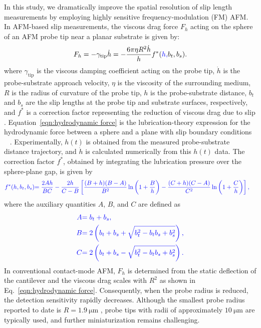 \documentclass[journal=jacsat,manuscript=article]{achemso}
\providecommand{\DIFadd}[1]{{\protect\color{blue}#1}} %
\providecommand{\DIFaddbegin}{} %
\providecommand{\DIFaddend}{} %
\newcommand{\DIFaddincludegraphics}[2][]{{\color{blue}\DIFOincludegraphics[#1]{#2}}} %
\DeclareRobustCommand{\DIFaddbegin}{\DIFOaddbegin \let\includegraphics\DIFaddincludegraphics} %
\DeclareRobustCommand{\DIFaddend}{\DIFOaddend \let\includegraphics\DIFOincludegraphics} %
\begin{document}
In this study, we dramatically improve the spatial resolution of slip length measurements by employing highly sensitive frequency-modulation (FM) AFM. In AFM-based slip measurements, the viscous drag force \(F_h\) acting on the sphere of an AFM probe tip near a planar substrate is given by:
\begin{equation}
F_h=-\gamma_{\text{tip}} \dot{h}=-\frac{6\pi\eta R^2 \dot{h}}{h} f^* (\DIFaddbegin \DIFadd{h,}\DIFaddend b_t,b_s). \label{eqn:hydrodynamic force}
\end{equation}
where \(\gamma_{\text{tip}}\) is the viscous damping coefficient acting on the probe tip, \DIFaddbegin \DIFadd{\(\dot{h}\) is the probe-substrate approach velocity, }\DIFaddend \(\eta\) is the viscosity of the surrounding medium, \(R\) is the radius of curvature of the probe tip, \(h\) is the probe-substrate distance, \(b_t\) and \(b_s\) are the slip lengths at the probe tip and substrate surfaces, respectively, and \(f^*\) is a correction factor representing the reduction of viscous drag due to slip \cite{Vinogradova1995-ct}. \DIFaddbegin \DIFadd{Equation~\ref{eqn:hydrodynamic force} is the lubrication-theory expression for the hydrodynamic force between a sphere and a plane with slip boundary conditions \mbox{%
\cite{Vinogradova1995-ct}}\hskip0pt%
. Experimentally, \(h(t)\) is obtained from the measured probe-substrate distance trajectory, and \(\dot{h}\) is calculated numerically from this \(h(t)\) data.
The correction factor \(f^*\), obtained by integrating the lubrication pressure over the sphere-plane gap, is given by
}\begin{align}
\DIFadd{f^* (h,b_t,b_s)
}&\DIFadd{= \frac{2Ah}{BC}
- \frac{2h}{C-B}
\left[
\frac{(B+h)(B-A)}{B^2}\ln\left(1+\frac{B}{h}\right)
- \frac{(C+h)(C-A)}{C^2}\ln\left(1+\frac{C}{h}\right)
\right], \label{eqn:fstar}
}\end{align}
\DIFadd{where the auxiliary quantities \(A\), \(B\), and \(C\) are defined as
}\begin{align}
\DIFadd{A }&\DIFadd{= b_t + b_s, \notag }\\
\DIFadd{B }&\DIFadd{= 2 \left( b_t + b_s
    + \sqrt{b_t^2 - b_t b_s + b_s^2} \right), \notag }\\
\DIFadd{C }&\DIFadd{= 2 \left( b_t + b_s
    - \sqrt{b_t^2 - b_t b_s + b_s^2} \right). \label{eqn:fstar_abc}
}\end{align}
\DIFaddend In conventional contact-mode AFM, \(F_h\) is determined from the static deflection of the cantilever and the viscous drag scales with \(R^2\) as shown in Eq.~\ref{eqn:hydrodynamic force}. Consequently, when the probe radius is reduced, the detection sensitivity rapidly decreases. Although the smallest probe radius reported to date is \(R = \SI{1.9}{\micro\metre}\) \cite{Vinogradova2003-gh}, probe tips with radii of approximately \(\SI{10}{\micro\metre}\) \cite{Li2022-qs} are typically used, and further miniaturization remains challenging.
\end{document}
